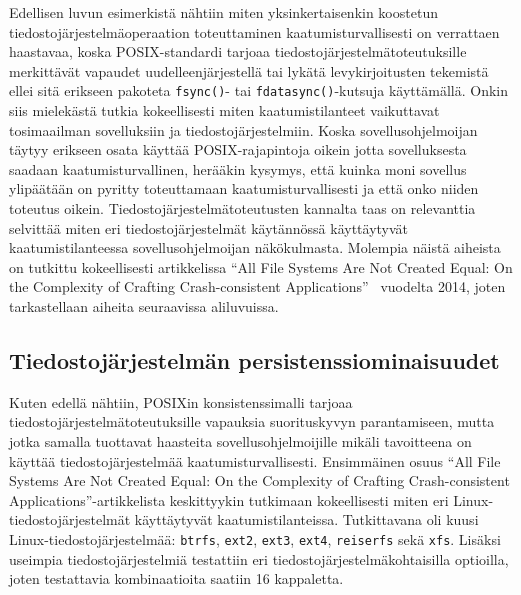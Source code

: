 Edellisen luvun esimerkistä nähtiin miten yksinkertaisenkin koostetun tiedostojärjestelmäoperaation toteuttaminen kaatumisturvallisesti on verrattaen haastavaa,
koska POSIX-standardi tarjoaa tiedostojärjestelmätoteutuksille merkittävät vapaudet uudelleenjärjestellä tai lykätä levykirjoitusten tekemistä ellei sitä erikseen pakoteta \texttt{fsync()}- tai \texttt{fdatasync()}-kutsuja käyttämällä.
Onkin siis mielekästä tutkia kokeellisesti miten kaatumistilanteet vaikuttavat tosimaailman sovelluksiin ja tiedostojärjestelmiin.
Koska sovellusohjelmoijan täytyy erikseen osata käyttää POSIX-rajapintoja oikein jotta sovelluksesta saadaan kaatumisturvallinen,
herääkin kysymys, että kuinka moni sovellus ylipäätään on pyritty toteuttamaan kaatumisturvallisesti ja että onko niiden toteutus oikein.
Tiedostojärjestelmätoteutusten kannalta taas on relevanttia selvittää miten eri tiedostojärjestelmät käytännössä käyttäytyvät kaatumistilanteessa sovellusohjelmoijan näkökulmasta.
Molempia näistä aiheista on tutkittu kokeellisesti artikkelissa ``All File Systems Are Not Created Equal: On the Complexity of Crafting Crash-consistent Applications''~\cite{PosixDataConsistency} vuodelta 2014,
joten tarkastellaan aiheita seuraavissa aliluvuissa.

\subsection{Tiedostojärjestelmän persistenssiominaisuudet}
Kuten edellä nähtiin, POSIXin konsistenssimalli tarjoaa tiedostojärjestelmätoteutuksille vapauksia suorituskyvyn parantamiseen,
mutta jotka samalla tuottavat haasteita sovellusohjelmoijille mikäli tavoitteena on käyttää tiedostojärjestelmää kaatumisturvallisesti.
Ensimmäinen osuus ``All File Systems Are Not Created Equal: On the Complexity of Crafting Crash-consistent Applications''-artikkelista keskittyykin tutkimaan kokeellisesti
miten eri Linux-tiedostojärjestelmät käyttäytyvät kaatumistilanteissa.
Tutkittavana oli kuusi Linux-tiedostojärjestelmää: \texttt{btrfs}, \texttt{ext2}, \texttt{ext3}, \texttt{ext4}, \texttt{reiserfs} sekä \texttt{xfs}.
Lisäksi useimpia tiedostojärjestelmiä testattiin eri tiedostojärjestelmäkohtaisilla optioilla,
joten testattavia kombinaatioita saatiin 16 kappaletta.


